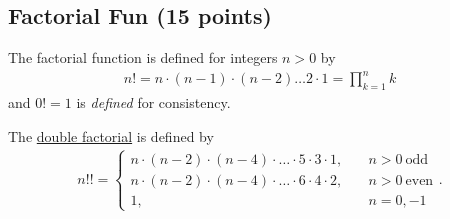 \documentclass[letterpaper]{scrartcl}
\begin{document}
\subsection{Factorial Fun (15 points)}
\label{sec:factorialfun}

The factorial function is defined for integers $n>0$ by
\begin{gather}
  \label{eq:factorial}
  n! = n \cdot(n-1) \cdot (n-2) \dots 2 \cdot 1 = \prod_{k=1}^{n}k
\end{gather}
and $0! = 1$ is \emph{defined} for consistency.

The \href{http://mathworld.wolfram.com/DoubleFactorial.html}{double
  factorial} is defined by
\begin{gather}
  n!! = \begin{cases}
    n \cdot (n-2) \cdot (n-4) \cdot \dots \cdot 5 \cdot 3 \cdot 1,& \quad n>0 \ \text{odd}\\
    n \cdot (n-2) \cdot (n-4) \cdot \dots \cdot 6 \cdot 4 \cdot 2,& \quad n>0 \ \text{even}\\
    1,& \quad n = 0, -1
  \end{cases}.\label{eq:doublefactorial}  
\end{gather}
\end{document}
